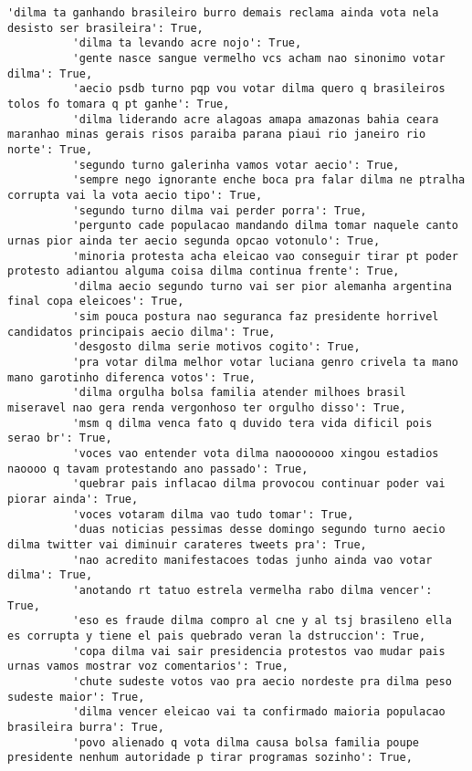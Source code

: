 \documentclass[11pt]{article}
\begin{document}
\begin{Verbatim}[commandchars=\\\{\}]
          'dilma ta ganhando brasileiro burro demais reclama ainda vota nela desisto ser brasileira': True,
          'dilma ta levando acre nojo': True,
          'gente nasce sangue vermelho vcs acham nao sinonimo votar dilma': True,
          'aecio psdb turno pqp vou votar dilma quero q brasileiros tolos fo tomara q pt ganhe': True,
          'dilma liderando acre alagoas amapa amazonas bahia ceara maranhao minas gerais risos paraiba parana piaui rio janeiro rio norte': True,
          'segundo turno galerinha vamos votar aecio': True,
          'sempre nego ignorante enche boca pra falar dilma ne ptralha corrupta vai la vota aecio tipo': True,
          'segundo turno dilma vai perder porra': True,
          'pergunto cade populacao mandando dilma tomar naquele canto urnas pior ainda ter aecio segunda opcao votonulo': True,
          'minoria protesta acha eleicao vao conseguir tirar pt poder protesto adiantou alguma coisa dilma continua frente': True,
          'dilma aecio segundo turno vai ser pior alemanha argentina final copa eleicoes': True,
          'sim pouca postura nao seguranca faz presidente horrivel candidatos principais aecio dilma': True,
          'desgosto dilma serie motivos cogito': True,
          'pra votar dilma melhor votar luciana genro crivela ta mano mano garotinho diferenca votos': True,
          'dilma orgulha bolsa familia atender milhoes brasil miseravel nao gera renda vergonhoso ter orgulho disso': True,
          'msm q dilma venca fato q duvido tera vida dificil pois serao br': True,
          'voces vao entender vota dilma naooooooo xingou estadios naoooo q tavam protestando ano passado': True,
          'quebrar pais inflacao dilma provocou continuar poder vai piorar ainda': True,
          'voces votaram dilma vao tudo tomar': True,
          'duas noticias pessimas desse domingo segundo turno aecio dilma twitter vai diminuir carateres tweets pra': True,
          'nao acredito manifestacoes todas junho ainda vao votar dilma': True,
          'anotando rt tatuo estrela vermelha rabo dilma vencer': True,
          'eso es fraude dilma compro al cne y al tsj brasileno ella es corrupta y tiene el pais quebrado veran la dstruccion': True,
          'copa dilma vai sair presidencia protestos vao mudar pais urnas vamos mostrar voz comentarios': True,
          'chute sudeste votos vao pra aecio nordeste pra dilma peso sudeste maior': True,
          'dilma vencer eleicao vai ta confirmado maioria populacao brasileira burra': True,
          'povo alienado q vota dilma causa bolsa familia poupe presidente nenhum autoridade p tirar programas sozinho': True,

\end{Verbatim}
\end{document}
